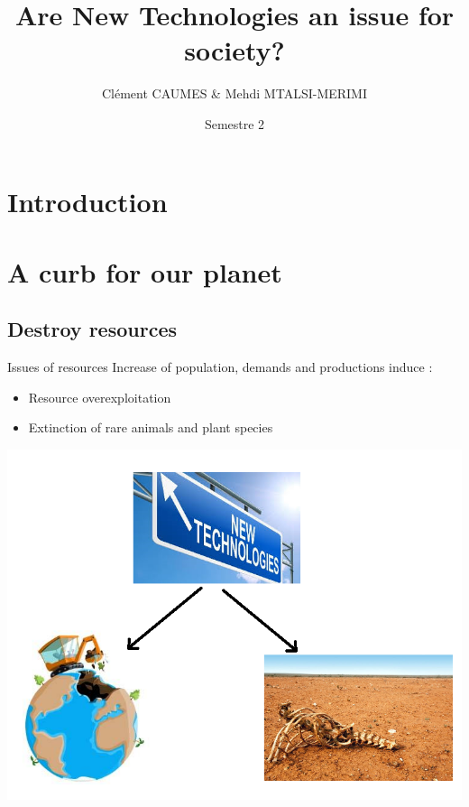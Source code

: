 \documentclass{beamer}
\title{Are New Technologies an issue for society?}
\author{Clément CAUMES \& Mehdi MTALSI-MERIMI}
\institute{UFR des Sciences Versailles - M1 Informatique}
\date{Semestre 2} %
\begin{document}
\section{Introduction}

  \begin{frame}
  \titlepage
  \end{frame}

\section{A curb for our planet}

\subsection{Destroy resources}

 \begin{frame}
\begin{block}{Issues of resources} 
	Increase of population, demands and productions induce :
	\begin{itemize}
		[circle]
		\item Resource overexploitation
		\item Extinction of rare animals and plant species
	\end{itemize}
	\hspace{2.5cm}
	\includegraphics[scale=0.3]{pics/image1.png}
	\end{block}
\end{frame}
\end{document}
